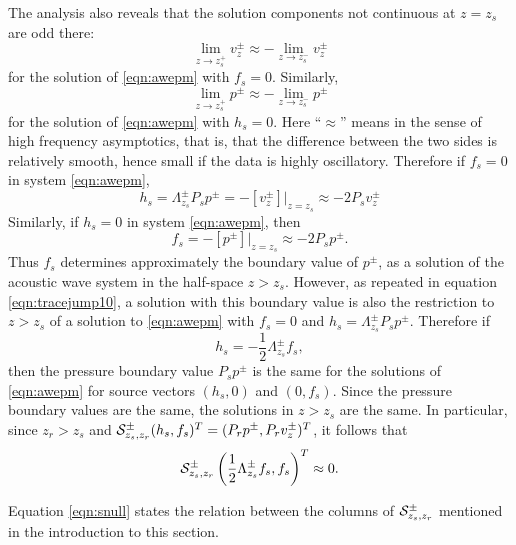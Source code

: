 The analysis also reveals that the solution components not continuous
at $z=z_s$ are odd there:
\begin{equation}
  \label{eqn:odd1}
  \lim_{z\rightarrow z_s^+} v^{\pm}_{z} \approx - \lim_{z\rightarrow z_s^-}
  v^{\pm}_{z}
\end{equation}
for the solution of \ref{eqn:awepm} with $f_s=0$.
Similarly, 
\begin{equation}
  \label{eqn:odd2}
  \lim_{z\rightarrow z_s^+} p^{\pm}\approx - \lim_{z\rightarrow z_s^-}
  p^{\pm}
\end{equation}
for the solution of \ref{eqn:awepm} with $h_s=0$. Here ``$\approx$''
means in the sense of high frequency asymptotics, that is, that the
difference between the two sides is relatively smooth, hence small if
the data is highly oscillatory. Therefore if $f_s=0$ in system \ref{eqn:awepm},
\begin{equation}
  h_s = \Lambda^{\pm}_{z_s}P_sp^{\pm} = -[v^{\pm}_{z}]|_{z=z_s} \approx -2
  P_sv^{\pm}_{z}
  \label{eqn:tracejump10}
\end{equation}
Similarly, if $h_s=0$ in system \ref{eqn:awepm}, then
\begin{equation}
  \label{eqn:tracejump20}
  f_s = -[p^{\pm}]|_{z=z_s} \approx -2 P_s p^{\pm}.
\end{equation}
Thus $f_s$ determines approximately the boundary value of $p^{\pm}$,
as a solution of the acoustic wave system in the half-space
$z>z_s$. However, as repeated in equation \ref{eqn:tracejump10}, a
solution with this boundary value is also the restriction to $z>z_s$
of a solution to \ref{eqn:awepm} with $f_s=0$ and $h_s=
\Lambda^{\pm}_{z_s}P_sp^{\pm}$. Therefore if
\begin{equation}
  \label{eqn:hfcondn}
  h_s =-\frac{1}{2}\Lambda^{\pm}_{z_s}f_s,
\end{equation}
then the pressure boundary value $P_sp^{\pm}$ is the
same for the solutions of \ref{eqn:awepm} for source vectors $(h_s,0)$
and $(0,f_s)$. Since the pressure boundary values are the same, the solutions
in $z>z_s$ are the same. In particular, since $z_r>z_s$ and ${\cal
  S}^{\pm}_{z_s,z_r}(h_s,f_s)^T = (P_rp^{\pm},P_rv^{\pm}_z)^T$, it follows
that
\begin{equation}
  \label{eqn:snull}
  {\cal S}^{\pm}_{z_s,z_r}\left(\frac{1}{2}\Lambda^{\pm}_{z_s}f_s,f_s\right)^T \approx 0.
\end{equation}

Equation \ref{eqn:snull} states the relation between the columns of $
{\cal S}^{\pm}_{z_s,z_r}$ mentioned in the introduction to this
section.


